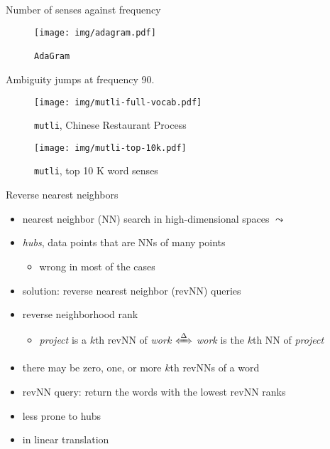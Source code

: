 \documentclass[10pt]{beamer}%
\newcommand{\bull}[1]{\begin{itemize}\item #1 \end{itemize}}
\newcommand{\adagram}{\texttt{AdaGram}}
\newcommand{\mutli}{\texttt{mutli}}
\begin{document}
\begin{frame}[allowframebreaks]{Number of senses against frequency}
  \begin{figure}
    \texttt{[image: img/adagram.pdf]}
    \caption{\adagram~\citep{Bartunov:2015}}
  \end{figure}
  Ambiguity jumps at frequency 90.


  \begin{figure}
  \texttt{[image: img/mutli-full-vocab.pdf]}
    \caption{\mutli, Chinese Restaurant Process \citep{Li:2015}}
  \end{figure}

  \begin{figure}
  \texttt{[image: img/mutli-top-10k.pdf]}
    \caption{\mutli, top 10 K word senses}
  \end{figure}
\end{frame}

\begin{frame}{Reverse nearest neighbors}
  \begin{itemize}
    \item nearest neighbor (NN) search in high-dimensional spaces $\leadsto$
    \item \emph{hubs}, data points that are NNs of many points
      \bull{wrong in most of the cases  \citep{Radovanovic:2010}}
    \item solution: reverse nearest neighbor (revNN) queries \\ \citep{Korn:2000}
    \item reverse neighborhood rank
      \bull{\emph{project} is a $k$th revNN of \emph{work}
      $\xLeftrightarrow\Delta$
      \emph{work} is the $k$th NN of \emph{project}}
    \item there may be zero, one, or more $k$th revNNs of a word
    \item revNN query: return the words with the lowest revNN ranks
    \item less prone to hubs
    \item in linear translation \citep{Dinu:2015,Lazaridou:2015}
  \end{itemize}
\end{frame}
\end{document}
